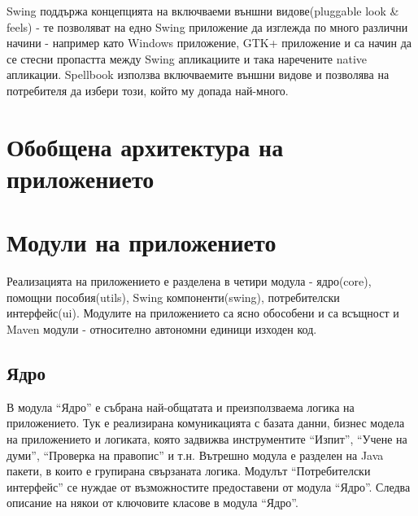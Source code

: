 Swing поддържа концепцията на включваеми външни видове(pluggable look
\& feels) - те позволяват на едно Swing приложение да изглежда по
много различни начини - например като Windows приложение, GTK+
приложение и са начин да се стесни пропастта между Swing апликациите и
така наречените native апликации. Spellbook използва включваемите
външни видове и позволява на потребителя да избери този, който му
допада най-много.
\section{Обобщена архитектура на приложението}
\section{Модули на приложението}
Реализацията на приложението е разделена в четири модула - ядро(core),
помощни пособия(utils), Swing компоненти(swing), потребителски
интерфейс(ui). Модулите на приложението са ясно обособени и са
всъщност и Maven модули - относително автономни единици изходен код.  
\subsection{Ядро}
В модула "`Ядро"' е събрана най-общатата и преизползваема логика на
приложението. Тук е реализирана комуникацията с базата данни, бизнес
модела на приложението и логиката, която задвижва инструментите
"`Изпит"', "`Учене на думи"', "`Проверка на правопис"' и т.н. Вътрешно
модула е разделен на Java пакети, в които е групирана свързаната
логика. Модулът "`Потребителски интерфейс"' се нуждае от възможностите
предоставени от модула "`Ядро"'. Следва описание на някои от ключовите
класове в модула "`Ядро"'.

